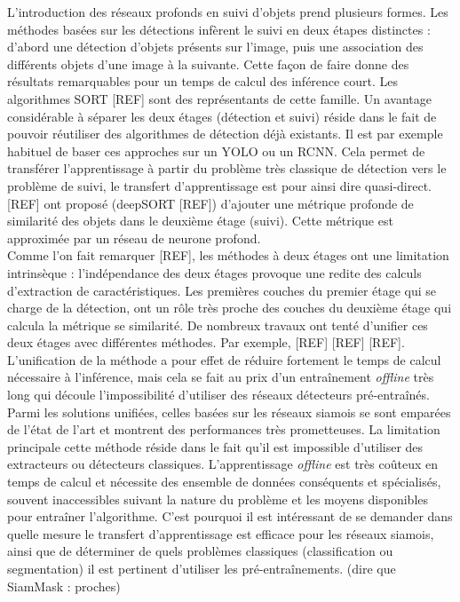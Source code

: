 \documentclass[10pt,twocolumn,letterpaper,french]{article}
\begin{document}
   L'introduction des réseaux profonds en suivi d'objets prend plusieurs formes. Les méthodes basées sur les détections infèrent le suivi en deux étapes distinctes : d'abord une détection d'objets présents sur l'image, puis une association des différents objets d'une image à la suivante. Cette façon de faire donne des résultats remarquables pour un temps de calcul des inférence court. Les algorithmes SORT [REF]  sont des représentants de cette famille. Un avantage considérable à séparer les deux étages (détection et suivi) réside dans le fait de pouvoir réutiliser des algorithmes de détection déjà existants. Il est par exemple habituel de baser ces approches sur un YOLO ou un RCNN. Cela permet de transférer l'apprentissage à partir du problème très classique de détection vers le problème de suivi, le transfert d'apprentissage est pour ainsi dire quasi-direct. [REF] ont proposé (deepSORT [REF]) d'ajouter une métrique profonde de similarité des objets dans le deuxième étage (suivi). Cette métrique est approximée par un réseau de neurone profond. \\
   
   Comme l'on fait remarquer [REF], les méthodes à deux étages ont une limitation intrinsèque : l'indépendance des deux étages provoque une redite des calculs d'extraction de caractéristiques. Les premières couches du premier étage qui se charge de la détection, ont un rôle très proche des couches du deuxième étage qui calcula la métrique se similarité. De nombreux travaux ont tenté d'unifier ces deux étages avec différentes méthodes. Par exemple, [REF] [REF] [REF]. L'unification de la méthode a pour effet de réduire fortement le temps de calcul nécessaire à l'inférence, mais cela se fait au prix d'un entraînement \textit{offline} très long qui découle l'impossibilité d'utiliser des réseaux détecteurs pré-entraînés.\\
   
   Parmi les solutions unifiées, celles basées sur les réseaux siamois se sont emparées de l'état de l'art et montrent des performances très prometteuses. La limitation principale cette méthode réside dans le fait qu'il est impossible d'utiliser des extracteurs ou détecteurs classiques. L'apprentissage \textit{offline} est très coûteux en temps de calcul et nécessite des ensemble de données conséquents et spécialisés, souvent inaccessibles suivant la nature du problème et les moyens disponibles pour entraîner l'algorithme. C'est pourquoi il est intéressant de se demander dans quelle mesure le transfert d'apprentissage est efficace pour les réseaux siamois, ainsi que de déterminer de quels problèmes classiques (classification ou segmentation) il est pertinent d'utiliser les pré-entraînements. (dire que SiamMask : proches) \\
   
\end{document}
